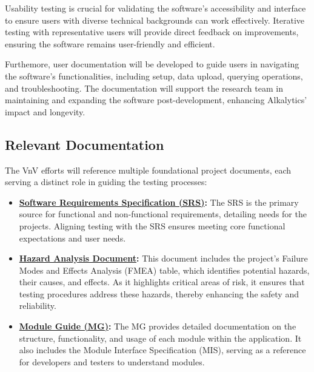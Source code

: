 \documentclass[12pt, titlepage]{article}
\begin{document}
\noindent Usability testing is crucial for validating the software’s
accessibility and interface to ensure users with diverse technical backgrounds
can work effectively. Iterative testing with representative users will provide
direct feedback on improvements, ensuring the software remains user-friendly and
efficient. \newline 

\noindent Furthemore, user documentation will be developed to guide users in
navigating the software’s functionalities, including setup, data upload,
querying operations, and troubleshooting. The documentation will support the
research team in maintaining and expanding the software post-development,
enhancing Alkalytics' impact and longevity.

\subsection{Relevant Documentation}

The VnV efforts will reference multiple foundational project documents, each
serving a distinct role in guiding the testing processes:

\begin{itemize}
    \item
    \textbf{\href{https://github.com/SumanyaG/Alkalytics/blob/f856af96669275cc29428a8f2cd4b863e4523ff6/docs/SRS/SRS.pdf}{Software
    Requirements Specification (SRS)}:} The SRS is the primary source for
    functional and non-functional requirements, detailing needs for the
    projects. Aligning testing with the SRS ensures meeting core functional
    expectations and user needs.
    
    \item
    \textbf{\href{https://github.com/SumanyaG/Alkalytics/blob/main/docs/HazardAnalysis/HazardAnalysis.pdf}{Hazard
    Analysis Document}:} This document includes the project’s Failure Modes and
    Effects Analysis (FMEA) table, which identifies potential hazards, their
    causes, and effects. As it highlights critical areas of risk, it ensures
    that testing procedures address these hazards, thereby enhancing the safety
    and reliability.

    \item
    \textbf{\href{https://github.com/SumanyaG/Alkalytics/blob/main/docs/Design/MG.pdf}{Module
    Guide (MG)}:} The MG provides detailed documentation on the structure,
    functionality, and usage of each module within the application. It also
    includes the Module Interface Specification (MIS), serving as a reference
    for developers and testers to understand modules.

\end{itemize}
\end{document}
